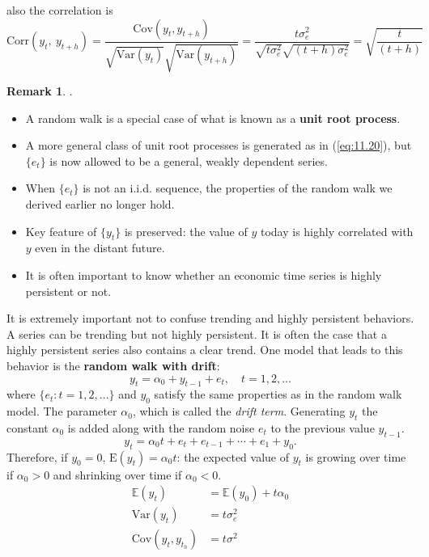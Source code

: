 \documentclass[a4paper, 10pt]{article}
\theoremstyle{definition}	%
\newtheorem*{remark}{Remark}
\begin{document}
also the correlation is
\begin{equation*}
    \mathrm{Corr}(y_t,\ y_{t+h}) = \frac{ \mathrm{Cov}(y_t, y_{t+h})}{\sqrt{\mathrm{Var}(y_t)}\sqrt{\mathrm{Var}(y_{t+h})}} = \frac{t\sigma_e^2}{\sqrt{t\sigma_e^2}\sqrt{(t+h)\sigma_e^2}} = \sqrt{\frac{t}{(t+h)}}
\end{equation*}
\begin{remark}.
    \begin{itemize}
        \item A random walk is a special case of what is known as a \textbf{unit root process}.
        \item A more general class of unit root processes is generated as in (\ref{eq:11.20}), but \( \{e_t\} \) is now allowed to be a general, weakly dependent series.
        \item When \( \{e_t\} \) is not an i.i.d. sequence, the properties of the random walk we derived earlier no longer hold.
        \item Key feature of \( \{y_t\} \) is preserved: the value of \( y \) today is highly correlated with \( y \) even in the distant future.
        \item It is often important to know whether an economic time series is highly persistent or not.
    \end{itemize}
\end{remark}
It is extremely important not to confuse trending and highly persistent behaviors. A series can be trending but not highly persistent. It is often the case that a highly persistent series also contains a clear trend. One model that leads to this behavior is the \textbf{random walk with drift}:
\begin{equation}
    y_t = \alpha_0 + y_{t-1} + e_t, \quad t = 1, 2, \dots \label{eq:11.23}
\end{equation}
where \( \{e_t: t = 1, 2, \dots \} \) and \( y_0 \) satisfy the same properties as in the random walk model. The parameter \( \alpha_0 \), which is called the \textit{drift term}. Generating \( y_t \) the constant \( \alpha_0 \) is added along with the random noise \( e_t \) to the previous value \( y_{t-1} \).
\[
y_t = \alpha_0 t + e_t + e_{t-1} + \cdots + e_1 + y_0.
\]
Therefore, if \( y_0 = 0 \), \( \text{E}(y_t) = \alpha_0 t \): the expected value of \( y_t \) is growing over time if \( \alpha_0 > 0 \) and shrinking over time if \( \alpha_0 < 0 \).
\begin{align*}
    \mathbb{E}(y_t) &= \mathbb{E}(y_0) + t\alpha_0\\
    \mathrm{Var}(y_t) &= t\sigma_e^2\\
    \mathrm{Cov}(y_t, y_{t_h}) &= t\sigma^2
\end{align*}
\end{document}
